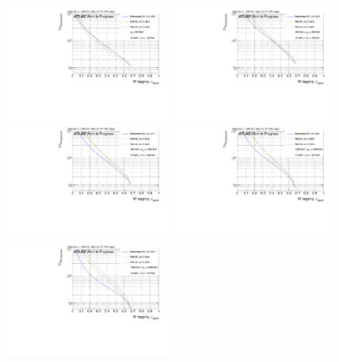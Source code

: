 \begin{figure}[h]
\includegraphics[width=0.48\textwidth]{sascha_input/Appendix/W_best/ROC_ALL_h_recoJet_D2_bin1.pdf} \hspace{1mm}
\includegraphics[width=0.48\textwidth]{sascha_input/Appendix/W_best/ROC_ALL_h_recoJet_D2_bin2.pdf}
\bigskip
\includegraphics[width=0.48\textwidth]{sascha_input/Appendix/W_best/ROC_ALL_h_recoJet_D2_bin3.pdf} \hspace{1mm}
\includegraphics[width=0.48\textwidth]{sascha_input/Appendix/W_best/ROC_ALL_h_recoJet_D2_bin4.pdf}
\bigskip
\includegraphics[width=0.48\textwidth]{sascha_input/Appendix/W_best/ROC_ALL_h_recoJet_D2_bin5.pdf} \hspace{1mm}

\end{figure}
